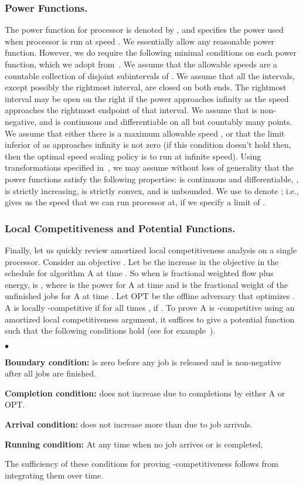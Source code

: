 \documentclass[11pt]{article}
\newcommand{\initOneLiners}{\setlength{\itemsep}{0pt}
    \setlength{\parsep }{0pt}
    \setlength{\topsep }{0pt}
}
\newenvironment{OneLiners}[1][\ensuremath{\bullet}]
    {\begin{list}
        {#1}
        {\initOneLiners}}
    {\end{list}}
\begin{document}
\subsubsection{Power Functions.}
The power function for processor  is denoted by , and
specifies the power used when processor is run at speed . We
essentially allow any reasonable power function.  However, we do require
the following minimal conditions on each power function, which we adopt
from~\cite{BCP}.  We assume that the allowable speeds are a countable
collection of disjoint subintervals of . We assume that all
the intervals, except possibly the rightmost interval, are closed on
both ends. The rightmost interval may be open on the right if the power
 approaches infinity as the speed  approaches the rightmost
endpoint of that interval.  We assume that  is non-negative, and
 is continuous and differentiable on all but countably many points.
We assume that either there is a maximum allowable speed , or that
the limit inferior of  as  approaches infinity is not zero
(if this condition doesn't hold then, then the optimal speed scaling
policy is to run at infinite speed). Using transformations specified
in~\cite{BCP}, we may assume without loss of generality that the power
functions satisfy the following properties:
 is continuous and differentiable,
,  is strictly increasing,
 is strictly convex, and   is unbounded.
We use  to denote ; i.e.,  gives us the speed
that we can run processor  at, if we specify a limit of .


\subsubsection{Local Competitiveness and Potential Functions.}
Finally, let us quickly review amortized local competitiveness analysis
on a single processor.
Consider an objective . Let  be the increase in the objective
in the schedule for algorithm A at time .  So when  is fractional weighted flow
plus energy,  is , where  is the power
for A at time  and  is the fractional weight of the unfinished jobs for A at
time .
Let
OPT be the offline adversary that optimizes .
A is locally -competitive if for all times , if
.
To prove A is -competitive using an amortized local competitiveness argument,
it suffices to give a potential function
 such that the following conditions hold (see for example~\cite{Pruhs07}).

\begin{OneLiners}
\item[{\bf Boundary condition:}]  is zero before any job is
  released and  is non-negative after all jobs are finished.
\item[{\bf Completion condition:}]
 does not increase due to completions by either A or OPT.
\item[{\bf Arrival condition:}]
 does not increase more than  due to job arrivals.

\item[{\bf Running condition:}]
  At any time  when no job arrives or is completed,
  
\end{OneLiners}
The sufficiency of these conditions for proving -competitiveness
follows from integrating them over time.
\end{document}
